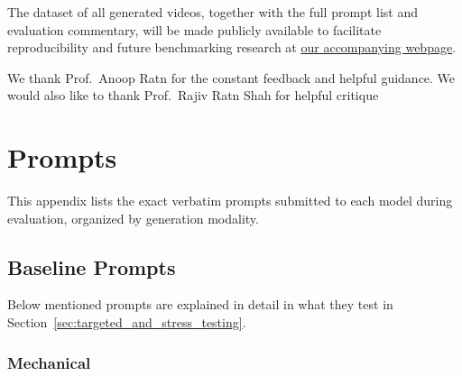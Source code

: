 \documentclass[sigconf]{acmart}
\begin{document}
The dataset of all generated videos, together with the full
prompt list and evaluation commentary, will be made publicly
available to facilitate reproducibility and future benchmarking
research at \href{https://t-cent.github.io/Character-Consistency}{our
    accompanying webpage}.

\begin{acks}
    We thank Prof.\ Anoop Ratn for the constant feedback and helpful guidance. We would also like to thank Prof.\ Rajiv Ratn Shah for helpful critique
\end{acks}




\appendix


\section{Prompts}
\label{app:prompts}

This appendix lists the exact verbatim prompts submitted to each model during evaluation, organized by generation modality.

\subsection{Baseline Prompts}
\label{app:baseline_prompts}

Below mentioned prompts are explained in detail in what they test in Section~\ref{sec:targeted_and_stress_testing}.

\subsubsection{Mechanical}
\end{document}
